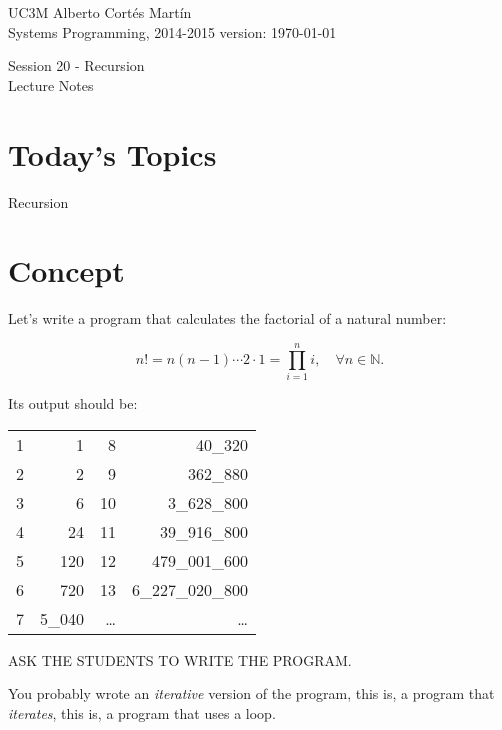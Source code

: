 \documentclass[a4paper, 9pt]{extarticle}
\newcommand{\realtitle}{Session 20 - Recursion}
\begin{document}
\makebox[\linewidth]{\rule{\textwidth}{0.4pt}}
UC3M \hfill Alberto Cortés Martín\\
Systems Programming, 2014-2015 \hfill version: \today\\
\makebox[\linewidth]{\rule{\textwidth}{0.4pt}}
\begin{center}
  \Large{\realtitle}\\Lecture Notes
\end{center}
\makebox[\linewidth]{\rule{\textwidth}{0.4pt}}
\vspace{1cm}


\section{Today's Topics}
\begin{blackboard}
Recursion
\end{blackboard}


\section{Concept}

Let's write a program that calculates the factorial of a natural number:

\begin{equation*}
  n! = n(n-1)\cdots2\cdot1=\prod_{i=1}^{n}i, \quad \forall n \in \mathbb{N}.
\end{equation*}

Its output should be:

\begin{center}
  \begin{tabular}[!ht]{|r|r||r|r|}
    \hline
    1 & 1      & 8  & 40\_320 \\
    2 & 2      & 9  & 362\_880 \\
    3 & 6      & 10 & 3\_628\_800 \\
    4 & 24     & 11 & 39\_916\_800 \\
    5 & 120    & 12 & 479\_001\_600 \\
    6 & 720    & 13 & 6\_227\_020\_800 \\
    7 & 5\_040 & \ldots & \ldots \\
    \hline
  \end{tabular}
\end{center}

ASK THE STUDENTS TO WRITE THE PROGRAM.

You probably wrote an \emph{iterative} version of the program, this is, a program that \emph{iterates}, this is, a program that uses a loop.
\end{document}
